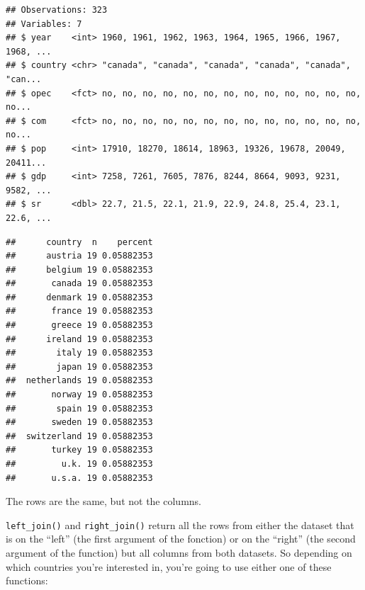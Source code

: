 \documentclass[]{gitbook}
\newenvironment{Shaded}{\begin{snugshade}}{\end{snugshade}}
\newcommand{\DataTypeTok}[1]{\textcolor[rgb]{0.13,0.29,0.53}{#1}}
\newcommand{\KeywordTok}[1]{\textcolor[rgb]{0.13,0.29,0.53}{\textbf{#1}}}
\newcommand{\NormalTok}[1]{#1}
\newcommand{\OperatorTok}[1]{\textcolor[rgb]{0.81,0.36,0.00}{\textbf{#1}}}
\newcommand{\StringTok}[1]{\textcolor[rgb]{0.31,0.60,0.02}{#1}}
\theoremstyle{definition}
\theoremstyle{definition}
\theoremstyle{definition}
\theoremstyle{remark}
\begin{document}
\begin{Shaded}
\end{Shaded}

\begin{verbatim}
## Observations: 323
## Variables: 7
## $ year    <int> 1960, 1961, 1962, 1963, 1964, 1965, 1966, 1967, 1968, ...
## $ country <chr> "canada", "canada", "canada", "canada", "canada", "can...
## $ opec    <fct> no, no, no, no, no, no, no, no, no, no, no, no, no, no...
## $ com     <fct> no, no, no, no, no, no, no, no, no, no, no, no, no, no...
## $ pop     <int> 17910, 18270, 18614, 18963, 19326, 19678, 20049, 20411...
## $ gdp     <int> 7258, 7261, 7605, 7876, 8244, 8664, 9093, 9231, 9582, ...
## $ sr      <dbl> 22.7, 21.5, 22.1, 21.9, 22.9, 24.8, 25.4, 23.1, 22.6, ...
\end{verbatim}

\begin{Shaded}
\end{Shaded}

\begin{verbatim}
##      country  n    percent
##      austria 19 0.05882353
##      belgium 19 0.05882353
##       canada 19 0.05882353
##      denmark 19 0.05882353
##       france 19 0.05882353
##       greece 19 0.05882353
##      ireland 19 0.05882353
##        italy 19 0.05882353
##        japan 19 0.05882353
##  netherlands 19 0.05882353
##       norway 19 0.05882353
##        spain 19 0.05882353
##       sweden 19 0.05882353
##  switzerland 19 0.05882353
##       turkey 19 0.05882353
##         u.k. 19 0.05882353
##       u.s.a. 19 0.05882353
\end{verbatim}

The rows are the same, but not the columns.

\texttt{left\_join()} and \texttt{right\_join()} return all the rows
from either the dataset that is on the ``left'' (the first argument of
the fonction) or on the ``right'' (the second argument of the function)
but all columns from both datasets. So depending on which countries
you're interested in, you're going to use either one of these functions:
\end{document}
